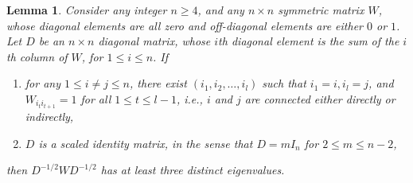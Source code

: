 \documentclass[11pt]{article}
\newtheorem{lemma}{Lemma}
\theoremstyle{definition}
\theoremstyle{remark}
\begin{document}
\begin{lemma}\label{lemma:three-eigenvalues}
Consider any integer $n\ge 4$, 
and any $n\times n$ symmetric matrix $W$, whose diagonal elements are all zero and off-diagonal elements are either $0$ or $1$.  
Let $D$ be an $n\times n$ diagonal matrix, whose $i$th diagonal element is the sum of the $i$th column of $W$, for $1\le i \le n$. 
If 
\begin{enumerate}[label={(\roman*)}, topsep=1ex,itemsep=-0.3ex,partopsep=1ex,parsep=1ex]
    \item for any $1\le i\ne j \le n$, there exist $(i_1, i_2, \ldots, i_l)$ such that $i_1 = i, i_l=j$, and $W_{i_t i_{t+1}} = 1$ for all $1\le t\le l-1$, 
    i.e., $i$ and $j$ are connected either directly or indirectly, 
    \item $D$ is a scaled identity matrix, in the sense that  $D = m I_n$ for $2 \le  m \le n-2$,
\end{enumerate}
then 
$D^{-1/2} W D^{-1/2}$ has at least three distinct eigenvalues. 
\end{lemma}
\end{document}
